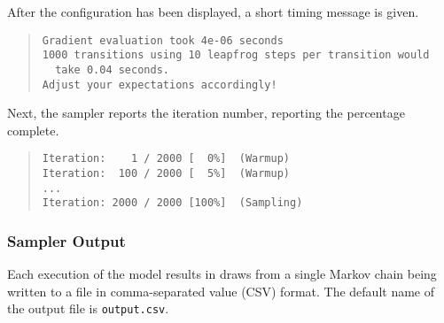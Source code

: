 %
After the configuration has been displayed, a short timing message is
given.
%
\begin{quote}
\begin{Verbatim}[fontsize=\small]
Gradient evaluation took 4e-06 seconds
1000 transitions using 10 leapfrog steps per transition would
  take 0.04 seconds.
Adjust your expectations accordingly!
\end{Verbatim}
\end{quote}
%
Next, the sampler reports the iteration number, reporting the
percentage complete.
%
\begin{quote}
\begin{Verbatim}[fontsize=\small]
Iteration:    1 / 2000 [  0%]  (Warmup)
Iteration:  100 / 2000 [  5%]  (Warmup)
...
Iteration: 2000 / 2000 [100%]  (Sampling)
\end{Verbatim}
\end{quote}

\subsubsection{Sampler Output}

Each execution of the model results in draws from a single Markov
chain being written to a file in comma-separated value (CSV) format.
The default name of the output file is \nolinkurl{output.csv}.

